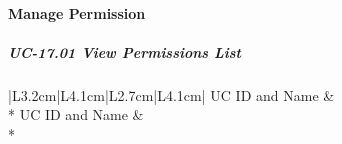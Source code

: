 \paragraph{Manage Permission}

\subparagraph{UC-17.01 View Permissions List}

{\singlespacing
\setlength{\extrarowheight}{4pt}
\begin{longtable}{|L{3.2cm}|L{4.1cm}|L{2.7cm}|L{4.1cm}|}
\hline
{}UC ID and Name &  \\* \hline
\endfirsthead
\hline
{}UC ID and Name &  \\* \hline
\endhead
\hline\endfoot
\endlastfoot


\end{longtable}}
